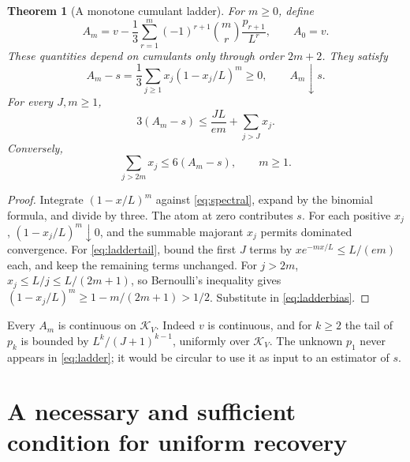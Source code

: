 \documentclass[11pt,letterpaper]{article}
\numberwithin{equation}{section}
\newtheorem{theorem}{Theorem}[section]
\theoremstyle{definition}
\theoremstyle{remark}
\newcommand{\K}{\mathcal K_V}
\begin{document}
\begin{theorem}[A monotone cumulant ladder]
\label{thm:ladder}
For $m\ge0$, define
\begin{equation}
 A_m=v-\frac13\sum_{r=1}^m(-1)^{r+1}\binom mr\frac{p_{r+1}}{L^r},
 \qquad A_0=v.
 \label{eq:ladder}
\end{equation}
These quantities depend on cumulants only through order $2m+2$. They satisfy
\begin{equation}
 A_m-s=\frac13\sum_{j\ge1}x_j(1-x_j/L)^m\ge0,
 \qquad A_m\downarrow s.
 \label{eq:ladderbias}
\end{equation}
For every $J,m\ge1$,
\begin{equation}
 3(A_m-s)\le\frac{JL}{em}+\sum_{j>J}x_j.
 \label{eq:laddertail}
\end{equation}
Conversely,
\begin{equation}
 \sum_{j>2m}x_j\le6(A_m-s),\qquad m\ge1.
 \label{eq:ladderconverse}
\end{equation}
\end{theorem}
\begin{proof}
Integrate $(1-x/L)^m$ against \eqref{eq:spectral}, expand by the binomial
formula, and divide by three. The atom at zero contributes $s$.
For each positive $x_j$, $(1-x_j/L)^m\downarrow0$, and the summable
majorant $x_j$ permits dominated convergence.
For \eqref{eq:laddertail}, bound the first $J$ terms by
$x e^{-mx/L}\le L/(em)$ each, and keep the remaining terms unchanged.
For $j>2m$, $x_j\le L/j\le L/(2m+1)$, so Bernoulli's inequality gives
$(1-x_j/L)^m\ge1-m/(2m+1)>1/2$. Substitute in
\eqref{eq:ladderbias}.
\end{proof}

Every $A_m$ is continuous on $\K$. Indeed $v$ is continuous, and for $k\ge2$
the tail of $p_k$ is bounded by $L^k/(J+1)^{k-1}$, uniformly over $\K$.
The unknown $p_1$ never appears in \eqref{eq:ladder}; it would be circular
to use it as input to an estimator of $s$.

\section{A necessary and sufficient condition for uniform recovery}
\label{sec:criterion}
\end{document}
